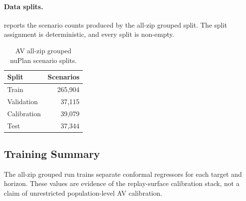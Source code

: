 \paragraph{Data splits.}
 reports the scenario counts produced by the all-zip grouped
split.  The split assignment is deterministic, and every split is non-empty.

\begin{table}[h]
\caption{AV all-zip grouped nuPlan scenario splits.}
\label{tab:av_splits}
\centering
\begin{tabular}{lr}
\toprule
\textbf{Split} & \textbf{Scenarios} \\
\midrule
Train       & 265{,}904 \\
Validation  & 37{,}115 \\
Calibration & 39{,}079 \\
Test        & 37{,}344 \\
\bottomrule
\end{tabular}
\end{table}

\subsection{Training Summary}

The all-zip grouped run trains separate conformal regressors for each target and
horizon.  These values are evidence of the replay-surface calibration stack, not a
claim of unrestricted population-level AV calibration.

\begin{table}[h]
\caption{All-zip grouped nuPlan conformal training summary.}
\label{tab:av_training}
\centering\scriptsize
{}
\end{table}

